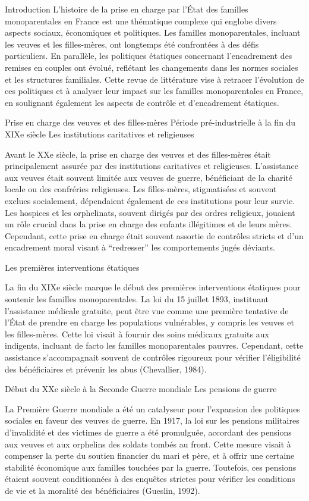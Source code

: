 \documentclass[
  12pt,
]{book}
\begin{document}
Introduction L'histoire de la prise en charge par l'État des familles
monoparentales en France est une thématique complexe qui englobe divers
aspects sociaux, économiques et politiques. Les familles monoparentales,
incluant les veuves et les filles-mères, ont longtemps été confrontées à
des défis particuliers. En parallèle, les politiques étatiques
concernant l'encadrement des remises en couples ont évolué, reflétant
les changements dans les normes sociales et les structures familiales.
Cette revue de littérature vise à retracer l'évolution de ces politiques
et à analyser leur impact sur les familles monoparentales en France, en
soulignant également les aspects de contrôle et d'encadrement étatiques.

Prise en charge des veuves et des filles-mères Période pré-industrielle
à la fin du XIXe siècle Les institutions caritatives et religieuses

Avant le XXe siècle, la prise en charge des veuves et des filles-mères
était principalement assurée par des institutions caritatives et
religieuses. L'assistance aux veuves était souvent limitée aux veuves de
guerre, bénéficiant de la charité locale ou des confréries religieuses.
Les filles-mères, stigmatisées et souvent exclues socialement,
dépendaient également de ces institutions pour leur survie. Les hospices
et les orphelinats, souvent dirigés par des ordres religieux, jouaient
un rôle crucial dans la prise en charge des enfants illégitimes et de
leurs mères. Cependant, cette prise en charge était souvent assortie de
contrôles stricts et d'un encadrement moral visant à ``redresser'' les
comportements jugés déviants.

Les premières interventions étatiques

La fin du XIXe siècle marque le début des premières interventions
étatiques pour soutenir les familles monoparentales. La loi du 15
juillet 1893, instituant l'assistance médicale gratuite, peut être vue
comme une première tentative de l'État de prendre en charge les
populations vulnérables, y compris les veuves et les filles-mères. Cette
loi visait à fournir des soins médicaux gratuits aux indigents, incluant
de facto les familles monoparentales pauvres. Cependant, cette
assistance s'accompagnait souvent de contrôles rigoureux pour vérifier
l'éligibilité des bénéficiaires et prévenir les abus (Chevallier, 1984).

Début du XXe siècle à la Seconde Guerre mondiale Les pensions de guerre

La Première Guerre mondiale a été un catalyseur pour l'expansion des
politiques sociales en faveur des veuves de guerre. En 1917, la loi sur
les pensions militaires d'invalidité et des victimes de guerre a été
promulguée, accordant des pensions aux veuves et aux orphelins des
soldats tombés au front. Cette mesure visait à compenser la perte du
soutien financier du mari et père, et à offrir une certaine stabilité
économique aux familles touchées par la guerre. Toutefois, ces pensions
étaient souvent conditionnées à des enquêtes strictes pour vérifier les
conditions de vie et la moralité des bénéficiaires (Gueslin, 1992).
\end{document}
